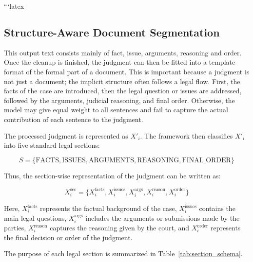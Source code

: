 ```latex

\subsection{Structure-Aware Document Segmentation}

This output text consists mainly of fact, issue, arguments, reasoning and order. Once the cleanup is finished, the judgment can then be fitted into a template format of the formal part of a document. This is important because a judgment is not just a document; the implicit structure often follows a legal flow. First, the facts of the case are introduced, then the legal question or issues are addressed, followed by the arguments, judicial reasoning, and final order. Otherwise, the model may give equal weight to all sentences and fail to capture the actual contribution of each sentence to the judgment.

The processed judgment is represented as \(X'_i\). 
The framework then classifies \(X'_i\) into five standard legal sections:

\begin{equation}
S = \{\text{FACTS}, \text{ISSUES}, \text{ARGUMENTS}, \text{REASONING}, \text{FINAL\_ORDER}\}
\end{equation}

Thus, the section-wise representation of the judgment can be written as:

\begin{equation}
X_i^{\text{sec}} =
\{X_i^{\text{facts}}, X_i^{\text{issues}}, X_i^{\text{args}}, X_i^{\text{reason}}, X_i^{\text{order}}\}
\end{equation}

Here, \(X_i^{\text{facts}}\) represents the factual background of the case, 
\(X_i^{\text{issues}}\) contains the main legal questions, \(X_i^{\text{args}}\) includes the 
arguments or submissions made by the parties, \(X_i^{\text{reason}}\) captures the 
reasoning given by the court, and \(X_i^{\text{order}}\) represents the final decision or order of the judgment.

The purpose of each legal section is summarized in Table~\ref{tab:section_schema}.

